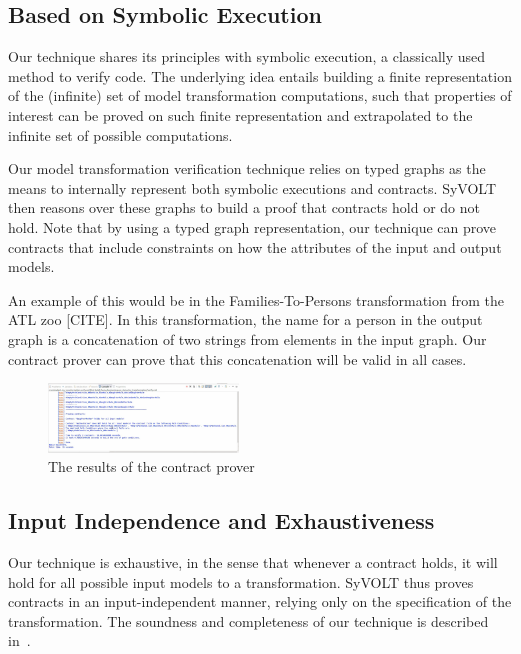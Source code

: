 \subsection{Based on Symbolic Execution}

Our technique shares its principles with symbolic execution, a
classically used method to verify code. The underlying idea entails building a
finite representation of the (infinite) set of model transformation
computations, such that properties of interest can be proved on such finite
representation and extrapolated to the infinite set of possible computations.

Our model transformation verification technique relies on typed graphs as the
means to internally represent both symbolic executions and contracts. SyVOLT
then reasons over these graphs to build a proof that contracts hold or do not
hold. Note that by using a typed graph representation, our technique can prove
contracts that include constraints on how the attributes of the input and output
models.

 An example of this would be in the
Families-To-Persons transformation from the ATL zoo [CITE]. In this transformation, the name for a person in the
output graph is a concatenation of two strings  from elements in the input graph. Our contract prover
can prove that this concatenation will be valid in all cases.

\begin{figure}
\centering
\includegraphics[width=0.45\textwidth]{figures/output}
\caption{The results of the contract prover}
\label{fig:output}
\end{figure}

\subsection{Input Independence and Exhaustiveness} 

Our technique is exhaustive, in the sense that whenever a contract holds, it
will hold for all possible input models to a transformation. SyVOLT thus proves
contracts in an input-independent manner, relying only on the specification of
the transformation. The soundness and completeness of our technique is described
in~\cite{Lucio2014}.

